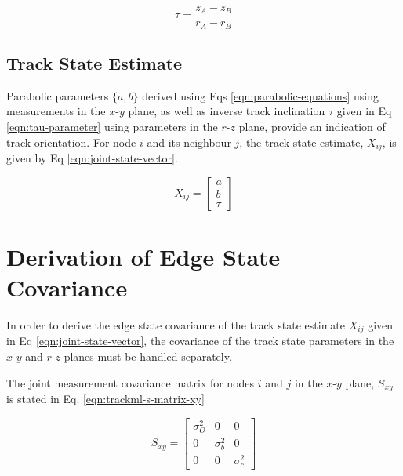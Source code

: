 \begin{equation}
\tau = \frac{z_A - z_B}{r_A - r_B}
\label{eqn:tau-parameter}
\end{equation}

\subsection{Track State Estimate}

Parabolic parameters $\{a, b\}$ derived using Eqs \eqref{eqn:parabolic-equations} using measurements in the $x$-$y$ plane, as well as inverse track inclination $\tau$ given in Eq \eqref{eqn:tau-parameter} using parameters in the $r$-$z$ plane, provide an indication of track orientation. For node $i$ and its neighbour $j$, the track state estimate, $X_{ij}$, is given by Eq \eqref{eqn:joint-state-vector}.

\begin{equation}
X_{ij} = \begin{bmatrix} a \\ b \\ \tau \end{bmatrix}
\label{eqn:joint-state-vector}
\end{equation}







\section{Derivation of Edge State Covariance}
\label{chapter-6-covariance-derivation}

In order to derive the edge state covariance of the track state estimate $X_{ij}$ given in Eq \eqref{eqn:joint-state-vector}, the covariance of the track state parameters in the $x$-$y$ and $r$-$z$ planes must be handled separately. 






The joint measurement covariance matrix for nodes $i$ and $j$ in the $x$-$y$ plane, $S_{xy}$ is stated in Eq. \eqref{eqn:trackml-s-matrix-xy}

\begin{equation}
    S_{xy} = \begin{bmatrix} \sigma_O^{2} & 0 & 0 \\ 0 & \sigma_b^{2} & 0 \\ 0 & 0 & \sigma_c^{2} \end{bmatrix} 
    \label{eqn:trackml-s-matrix-xy}
\end{equation}


